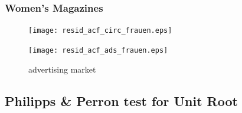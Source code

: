 \documentclass[12pt,a4paper,notitlepage]{article}
\begin{document}
\begin{appendices}
\subsubsection{Women's Magazines}

\begin{figure}[H]
\begin{minipage}{.5\textwidth}
	\centering
	\texttt{[image: resid\_acf\_circ\_frauen.eps]}
\end{minipage}
\hfil
\begin{minipage}{.5\textwidth}
	\centering
	\caption{advertising market}
	\texttt{[image: resid\_acf\_ads\_frauen.eps]}
\end{minipage}
\label{resid_acf_frauen}
\end{figure}


\subsection{Philipps & Perron test for Unit Root}



\end{appendices}
\end{document}
